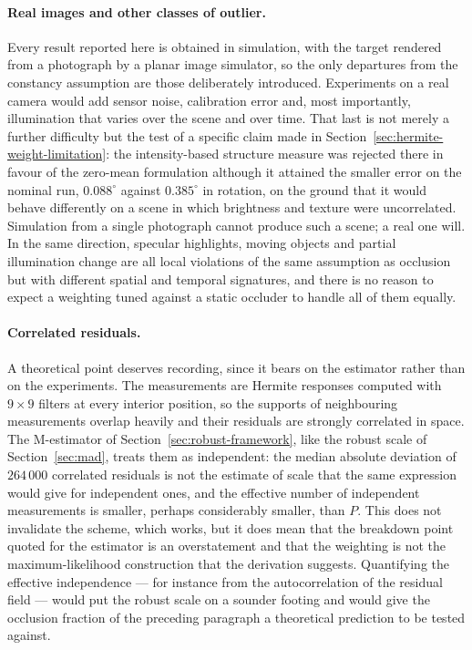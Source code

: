 \paragraph{Real images and other classes of outlier.}
Every result reported here is obtained in simulation, with the target rendered
from a photograph by a planar image simulator, so the only departures from the
constancy assumption are those deliberately introduced. Experiments on a real
camera would add sensor noise, calibration error and, most importantly,
illumination that varies over the scene and over time. That last is not merely
a further difficulty but the test of a specific claim made in
Section~\ref{sec:hermite-weight-limitation}: the intensity-based structure
measure was rejected there in favour of the zero-mean formulation although it
attained the smaller error on the nominal run, $0.088^{\circ}$ against
$0.385^{\circ}$ in rotation, on the ground that it would behave differently on
a scene in which brightness and texture were uncorrelated. Simulation from a
single photograph cannot produce such a scene; a real one will. In the same
direction, specular highlights, moving objects and partial illumination change
are all local violations of the same assumption as occlusion but with
different spatial and temporal signatures, and there is no reason to expect a
weighting tuned against a static occluder to handle all of them equally.

\paragraph{Correlated residuals.}
A theoretical point deserves recording, since it bears on the estimator rather
than on the experiments. The measurements are Hermite responses computed with
$9\times9$ filters at every interior position, so the supports of neighbouring
measurements overlap heavily and their residuals are strongly correlated in
space. The M-estimator of Section~\ref{sec:robust-framework}, like the robust
scale of Section~\ref{sec:mad}, treats them as independent: the median
absolute deviation of $264\,000$ correlated residuals is not the estimate of
scale that the same expression would give for independent ones, and the
effective number of independent measurements is smaller, perhaps considerably
smaller, than $P$. This does not invalidate the scheme, which works, but it
does mean that the breakdown point quoted for the estimator is an
overstatement and that the weighting is not the maximum-likelihood
construction that the derivation suggests. Quantifying the effective
independence --- for instance from the autocorrelation of the residual field
--- would put the robust scale on a sounder footing and would give the
occlusion fraction of the preceding paragraph a theoretical prediction to be
tested against.

